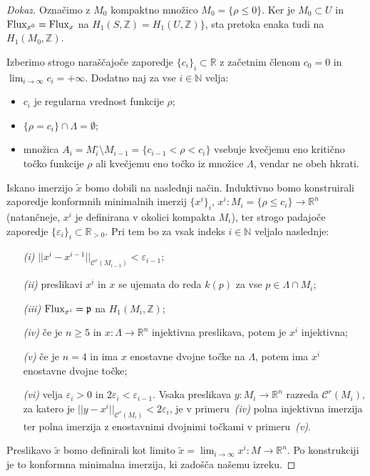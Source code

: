 \documentclass[12pt,a4paper,twoside]{article}
\theoremstyle{definition} %
\newenvironment{dokaz}[1][Dokaz]{\begin{proof}[#1]}{\end{proof}}
\theoremstyle{plain} %
\numberwithin{equation}{section}  %
\newcommand{\Z}{\mathbb Z}
\begin{document}
\begin{dokaz}
Označimo z $M_{0}$ kompaktno množico $M_{0} = \{ \rho \leq 0 \}$.
Ker je $M_{0} \subset U$ in $\textup{Flux}_{x^{0}} = \textup{Flux}_{x}$ na $H_{1}(S, \mathbb{Z}) = H_{1}(U, \mathbb{Z}) \}$, sta pretoka enaka tudi na $H_{1}(M_{0}, \mathbb{Z})$.

Izberimo strogo naraščajoče zaporedje $\{ c_{i} \}_{i} \subset \mathbb{R}$ z začetnim členom $c_0=0 $ in $\lim_{i \to \infty}c_{i} = + \infty$. Dodatno naj za vse $i \in \mathbb{N}$ velja:
\begin{itemize}
\item $c_{i}$ je regularna vrednost funkcije $\rho$;
\item $ \{ \rho = c_{i} \} \cap \Lambda = \emptyset$;
\item množica $A_{i} = M_{i}^{\circ} \setminus M_{i-1} = \{ c_{i-1} < \rho < c_{i} \}$ vsebuje kvečjemu eno kritično točko funkcije $\rho$ ali kvečjemu eno točko iz množice $\Lambda$, vendar ne obeh hkrati.
\end{itemize}
%
Iskano imerzijo $\tilde{x}$ bomo dobili na naslednji način. Induktivno bomo konstruirali zaporedje konformnih minimalnih imerzij $\{ x^{i} \}_{i}$, $x^{i} \colon M_{i} = \{ \rho \leq c_{i} \} \to \mathbb{R}^{n}$ (natančneje, $x^{i}$ je definirana v okolici kompakta $M_{i}$), ter strogo padajoče zaporedje $\{ \varepsilon_{i} \}_{i} \subset \mathbb{R}_{>0}$. Pri tem bo za vsak indeks $i \in \mathbb{N}$ veljalo naslednje:
\begin{itemize}
\item[\textit{(i)}] $||x^{i} - x^{i-1}||_{\mathcal{C}^{r}(M_{i-1})} < \varepsilon_{i-1}$;
\item[\textit{(ii)}] preslikavi $x^{i}$ in $x$ se ujemata do reda $k(p)$ za vse $p \in \Lambda \cap M_{i}$;
\item[\textit{(iii)}] $\textup{Flux}_{x^{i}} = \mathfrak{p}$ na $H_{1}(M_{i},\Z)$;
\item[\textit{(iv)}] če je $n \geq 5$ in $x \colon \Lambda \to \mathbb{R}^{n}$ injektivna preslikava, potem je $x^{i}$ injektivna;
\item[\textit{(v)}] če je $n=4$ in ima $x$ enostavne dvojne točke na $\Lambda$, potem ima $x^{i}$ enostavne dvojne točke;
\item[\textit{(vi)}] velja $\varepsilon_{i} > 0$ in $2 \varepsilon_{i} < \varepsilon_{i-1}$.
	Vsaka preslikava $y \colon M_{i} \to \mathbb{R}^{n}$ razreda $\mathcal{C}^{r}(M_{i})$, za katero je 
	$||y-x^{i}||_{\mathcal{C}^{r}(M_{i})} < 2\varepsilon_{i}$, 
	je v primeru~\textit{(iv)} polna injektivna imerzija ter polna imerzija z enostavnimi dvojnimi točkami v primeru~\textit{(v)}.
\end{itemize}
%
Preslikavo $\tilde{x}$ bomo definirali kot limito $\tilde{x} = \lim_{i \to \infty}x^{i} \colon M \to \mathbb{R}^{n}$. Po konstrukciji je to konformna minimalna imerzija, ki zadošča našemu izreku.


\end{dokaz}
\end{document}

